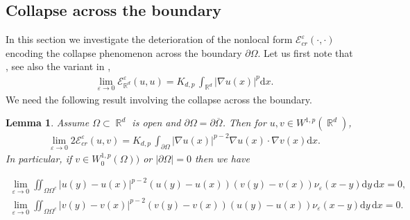 \documentclass[12pt, reqno]{amsart}%
\theoremstyle{plain}  %
\newtheorem{lemma}[theorem]{Lemma}
\theoremstyle{definition}  %
\numberwithin{equation}{section}
\DeclareMathOperator{\R}{\mathbb{R}}
\newcommand{\iil}{\iint}
\renewcommand{\d}{\mathrm{d}}
\newcommand{\eps}{\varepsilon}
\begin{document}
\subsection{Collapse across the boundary}
\noindent In this section we investigate the deterioration of the nonlocal form  $\mathcal{E}^{\eps}_{cr}(\cdot,\cdot)$ encoding the collapse phenomenon across the boundary $\partial\Omega$.  Let us first note that \cite[Theorem 5.23]{guy-thesis}, see also the variant in \cite{Brezis-const-function, BBM01,Fog23},
%
\begin{align}
&\lim_{\eps\to0}\mathcal{E}^{\eps}_{\R^d}(u,u)
=K_{d,p}\,\int_{\R^d}|\nabla u(x)|^p\d x.
\label{eq:form-conv-full}
\end{align}
We need the following result involving the collapse across the boundary.
\begin{lemma}\label{lem:collap-bdary}
Assume $\Omega\subset \R^d$ is open and $\partial\Omega= \partial \overline{\Omega}$. Then for  $u,v\in W^{1,p}(\R^d)$,
\begin{align*}
&\lim_{\eps\to0}2\mathcal{E}^{\eps}_{cr}(u,v) = K_{d,p}\,\int_{\partial \Omega}|\nabla u(x)|^{p-2}\nabla u(x)\cdot \nabla v(x)\d x.
\end{align*}
In particular, if  $v\in W^{1,p}_0(\Omega))$ or  $|\partial\Omega|=0$ then we have

\begin{align*}
\lim_{\eps\to0}\iil_{\Omega \Omega^c} |u(y)-u(x)|^{p-2}(u(y)-u(x)) (v(y)-v(x))\nu_\eps(x-y)\d y\,\d x= 0,\\
\lim_{\eps\to0}\iil_{\Omega \Omega^c} |v(y)-v(x)|^{p-2}(v(y)-v(x)) (u(y)-u(x))\nu_\eps(x-y)\d y\,\d x= 0.
\end{align*}
\end{lemma}
\end{document}
